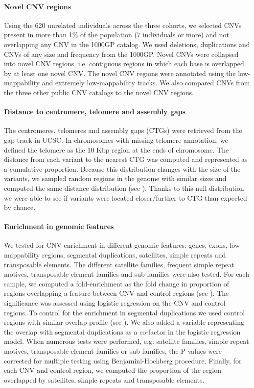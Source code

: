 \paragraph{Novel CNV regions}
Using the 620 unrelated individuals across the three cohorts, we selected CNVs present in more than 1\% of the population (7 individuals or more) and not overlapping any CNV in the 1000GP catalog\cite{Sudmant2015a}.
We used deletions, duplications and CNVs of any size and frequency from the 1000GP.
Novel CNVs were collapsed into novel CNV regions, i.e. contiguous regions in which each base is overlapped by at least one novel CNV.
The novel CNV regions were annotated using the low-mappability and extremely low-mappability tracks.
We also compared CNVs from the three other public CNV catalogs to the novel CNV regions.

\paragraph{Distance to centromere, telomere and assembly gaps}
The centromeres, telomeres and assembly gaps (CTGs) were retrieved from the {\sf gap} track in UCSC\cite{Rosenbloom2015}.
In chromosomes with missing telomere annotation, we defined the telomere as the 10 Kbp region at the ends of chromosome.
The distance from each variant to the nearest CTG was computed and represented as a cumulative proportion.
Because this distribution changes with the size of the variants, we sampled random regions in the genome with similar sizes and computed the same distance distribution (see ).
Thanks to this null distribution we were able to see if variants were located closer/further to CTG than expected by chance.

\paragraph{Enrichment in genomic features}
We tested for CNV enrichment in different genomic features: genes, exons, low-mappability regions, segmental duplications, satellites, simple repeats and transposable elements.
The different satellite families, frequent simple repeat motives, transposable element families and sub-families were also tested.
For each sample, we computed a fold-enrichment as the fold change in proportion of regions overlapping a feature between CNV and control regions (see ).
The significance was assessed using logistic regression on the CNV and control regions.
To control for the enrichment in segmental duplications we used control regions with similar overlap profile (see ).
We also added a variable representing the overlap with segmental duplications as a co-factor in the logistic regression model.
When numerous tests were performed, e.g. satellite families, simple repeat motives, transposable element families or sub-families, the P-values were corrected for multiple testing using Benjamini-Hochberg procedure.
Finally, for each CNV and control region, we computed the proportion of the region overlapped by satellites, simple repeats and transposable elements.


